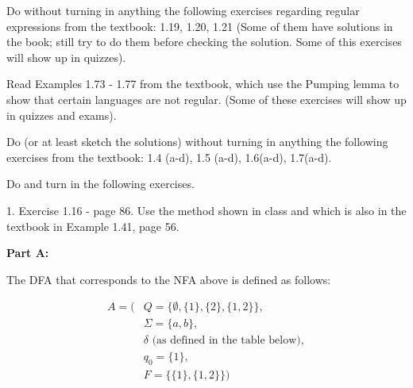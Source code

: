 \documentclass[12pt,letterpaper,final]{report}
\author{Jonathan Llovet}
\begin{document}
\vline

Do without turning in anything the following exercises regarding regular expressions from the textbook: 1.19, 1.20, 1.21  (Some of them have solutions in the book; still try to do them before checking the solution. Some of this exercises will show up in quizzes).


Read Examples 1.73 - 1.77  from the textbook, which use the Pumping lemma to show that certain languages are not regular. (Some of these exercises will show up in quizzes and exams).

Do (or at least sketch the solutions) without turning in anything the following exercises from the textbook: 1.4 (a-d), 1.5 (a-d), 1.6(a-d), 1.7(a-d).

\medskip

Do and turn in the following exercises.

\pagebreak

1.  Exercise 1.16  - page 86. Use the method shown in class and which is also in the textbook in Example 1.41, page 56.

  {\bf Part A:}

\begin{center}
\end{center}

The DFA that corresponds to the NFA above is defined as follows:

\begin{align*}
  A = \Big( & Q = \{\emptyset, \{1\}, \{2\}, \{1,2\}\},       \\
            & \Sigma = \{a,b\},                               \\
            & \delta \text{ (as defined in the table below)}, \\
            & q_0 = \{1\},                                    \\
            & F = \{\{1\}, \{1,2\}\} \Big)
\end{align*}
\end{document}
